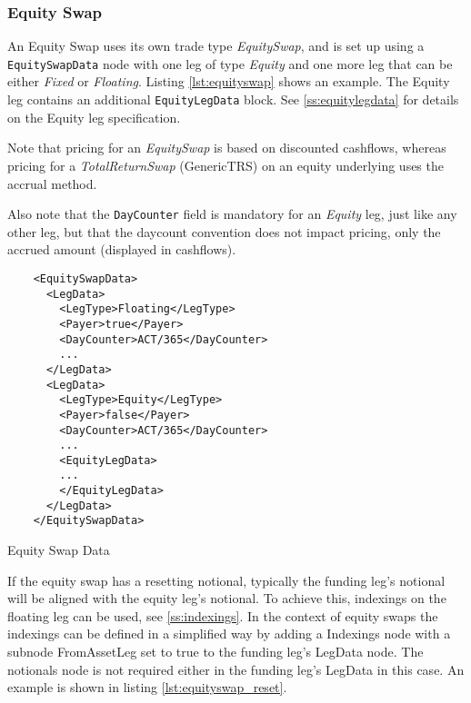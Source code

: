 \subsubsection{Equity Swap}
\label{ss:equity_swap}

An Equity Swap uses its own trade type  \emph{EquitySwap}, and is set up using a {\tt EquitySwapData} node with one leg of type  \emph{Equity} and one more leg that can be either \emph{Fixed} or  \emph{Floating}. Listing \ref{lst:equityswap} shows an example. The
Equity leg contains an additional {\tt EquityLegData} block. See \ref{ss:equitylegdata} for details on the Equity leg specification.

Note that pricing for an \emph{EquitySwap} is based on discounted cashflows, whereas pricing for a \emph{TotalReturnSwap} (GenericTRS) on an equity underlying uses the accrual method.

Also note that the {\tt DayCounter} field is mandatory for an \emph{Equity} leg, just like any other leg, but that the daycount convention does not impact pricing, only the accrued amount (displayed in cashflows).


\begin{listing}[H]
\begin{verbatim}
    <EquitySwapData>
      <LegData>
        <LegType>Floating</LegType>
        <Payer>true</Payer>
        <DayCounter>ACT/365</DayCounter>
        ...
      </LegData>
      <LegData>
        <LegType>Equity</LegType>
        <Payer>false</Payer>
        <DayCounter>ACT/365</DayCounter>
        ...
        <EquityLegData>
        ...
        </EquityLegData>
      </LegData>
    </EquitySwapData>
\end{verbatim}
\caption{Equity Swap Data}
\label{lst:equityswap}
\end{listing}

If the equity swap has a resetting notional, typically the funding leg's notional will be aligned with the equity leg's
notional. To achieve this, indexings on the floating leg can be used, see \ref{ss:indexings}. In the context of equity
swaps the indexings can be defined in a simplified way by adding a Indexings node with a subnode FromAssetLeg set to
true to the funding leg's LegData node. The notionals node is not required either in the funding leg's LegData in this
case. An example is shown in listing \ref{lst:equityswap_reset}.


